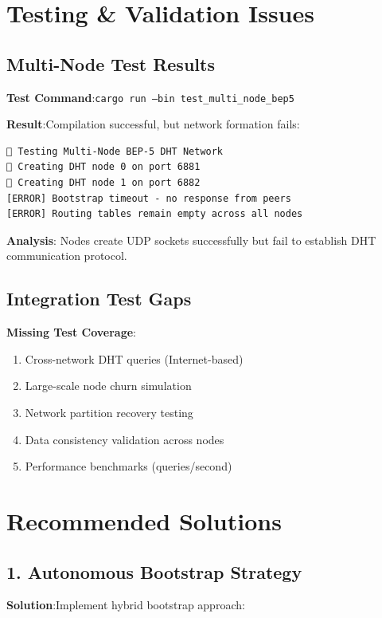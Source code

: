 \documentclass[11pt,a4paper]{article}
\begin{document}
{{{{\section{Testing \& Validation Issues}

\subsection{Multi-Node Test Results}

\textbf{Test Command}:\texttt{cargo run --bin test\_multi\_node\_bep5}

\textbf{Result}:Compilation successful, but network formation fails:

\begin{lstlisting}
🚀 Testing Multi-Node BEP-5 DHT Network
🔨 Creating DHT node 0 on port 6881
🔨 Creating DHT node 1 on port 6882
[ERROR] Bootstrap timeout - no response from peers
[ERROR] Routing tables remain empty across all nodes
\end{lstlisting}

\textbf{Analysis}: Nodes create UDP sockets successfully but fail to establish DHT communication protocol.

\subsection{Integration Test Gaps}

\textbf{Missing Test Coverage}:
\begin{enumerate}
    \item Cross-network DHT queries (Internet-based)
    \item Large-scale node churn simulation
    \item Network partition recovery testing
    \item Data consistency validation across nodes
    \item Performance benchmarks (queries/second)
\end{enumerate}

\section{Recommended Solutions}

\subsection{1. Autonomous Bootstrap Strategy}

\textbf{Solution}:Implement hybrid bootstrap approach:

}}}}
\end{document}
